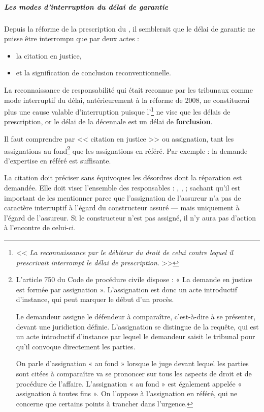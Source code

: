 				\subparagraph{Les modes d'interruption du délai de garantie}

				Depuis la réforme de la prescription du , il semblerait que le délai de garantie ne puisse être interrompu que par deux actes :
				\begin{itemize}
					\item la citation en justice,
					\item et la signification de conclusion reconventionnelle.
				\end{itemize}

				La reconnaissance de responsabilité qui était reconnue par les tribunaux comme mode interruptif du délai, antérieurement à la réforme de 2008, ne constituerai plus une cause valable d'interruption puisque l'\footnote{<<  {\itshape La reconnaissance par le débiteur du droit de celui contre lequel il prescrivait interrompt le délai de prescription.} >>} ne vise que les délais de prescription, or le délai de la décennale est un délai de \textbf{forclusion}.

				Il faut comprendre par << citation en justice >> ou assignation, tant les assignations au fond\footnote{
					L’article 750 du Code de procédure civile dispose : « La demande en justice est formée par assignation \lips ». L’assignation est donc un acte introductif d’instance, qui peut marquer le début d’un procès.

					Le demandeur assigne le défendeur à comparaître, c’est-à-dire à se présenter, devant une juridiction définie. L’assignation se distingue de la requête, qui est un acte introductif d’instance par lequel le demandeur saisit le tribunal pour qu’il convoque directement les parties.

					On parle d’assignation « au fond » lorsque le juge devant lequel les parties sont citées à comparaître va se prononcer sur tous les aspects de droit et de procédure de l’affaire. L’assignation « au fond » est également appelée « assignation à toutes fins ». On l’oppose à l’assignation en référé, qui ne concerne que certains points à trancher dans l’urgence.
				}
				que les assignations en référé.  Par exemple : la demande d'expertise en référé est suffisante.

				La citation doit préciser sans équivoques les désordres dont la réparation est demandée. Elle doit viser l'ensemble des responsables : \E, \archi, \Moe ; sachant qu'il est important de les mentionner parce que l'assignation de l'assureur n'a pas de caractère interruptif à l'égard du constructeur assuré --- mais uniquement à l'égard de l'assureur. Si le constructeur n'est pas assigné, il n'y aura pas d'action à l'encontre de celui-ci.

